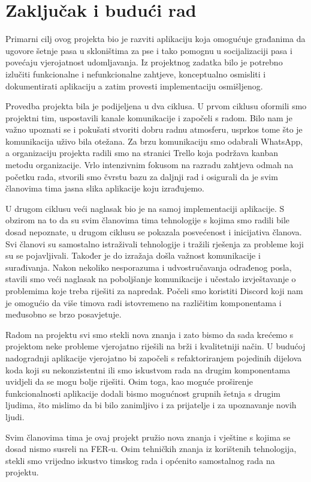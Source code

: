 \chapter{Zaključak i budući rad}

Primarni cilj ovog projekta bio je razviti aplikaciju koja omogućuje građanima da ugovore šetnje pasa u skloništima za pse i tako pomognu u socijalizaciji pasa i povećaju vjerojatnost udomljavanja. Iz projektnog zadatka bilo je potrebno izlučiti funkcionalne i nefunkcionalne zahtjeve, konceptualno osmisliti i dokumentirati aplikaciju a zatim provesti implementaciju osmišljenog.
		
Provedba projekta bila je podijeljena u dva ciklusa. U prvom ciklusu oformili smo projektni tim, uspostavili kanale komunikacije i započeli s radom. Bilo nam je važno upoznati se i pokušati stvoriti dobru radnu atmosferu, usprkos tome što je komunikacija uživo bila otežana. Za brzu komunikaciju smo odabrali WhatsApp, a organizaciju projekta radili smo na stranici Trello koja podržava kanban metodu organizacije. Vrlo intenzivnim fokusom na razradu zahtjeva odmah na početku rada, stvorili smo čvrstu bazu za daljnji rad i osigurali da je svim članovima tima jasna slika aplikacije koju izrađujemo. 
		
U drugom ciklusu veći naglasak bio je na samoj implementaciji aplikacije. S obzirom na to da su svim članovima tima tehnologije s kojima smo radili bile dosad nepoznate, u drugom ciklusu se pokazala posvećenost i inicijativa članova. Svi članovi su samostalno istraživali tehnologije i tražili rješenja za probleme koji su se pojavljivali. Također je do izražaja došla važnost komunikacije i surađivanja. Nakon nekoliko nesporazuma i udvostručavanja odrađenog posla, stavili smo veći naglasak na poboljšanje komunikacije i učestalo izvještavanje o problemima koje treba riješiti za napredak. Počeli smo koristiti Discord koji nam je omogućio da više timova radi istovremeno na različitim komponentama i međusobno se brzo posavjetuje.
		
Radom na projektu svi smo stekli nova znanja i zato bismo da sada krećemo s projektom neke probleme vjerojatno riješili na brži i kvalitetniji način. U budućoj nadogradnji aplikacije vjerojatno bi započeli s refaktoriranjem pojedinih dijelova koda koji su nekonzistentni ili smo iskustvom rada na drugim komponentama uvidjeli da se mogu bolje riješiti. Osim toga, kao moguće proširenje funkcionalnosti aplikacije dodali bismo mogućnost grupnih šetnja s drugim ljudima, što mislimo da bi bilo zanimljivo i za prijatelje i za upoznavanje novih ljudi.

Svim članovima tima je ovaj projekt pružio nova znanja i vještine s kojima se dosad nismo susreli na FER-u. Osim tehničkih znanja iz korištenih tehnologija, stekli smo vrijedno iskustvo timskog rada i općenito samostalnog rada na projektu.
		
		\eject